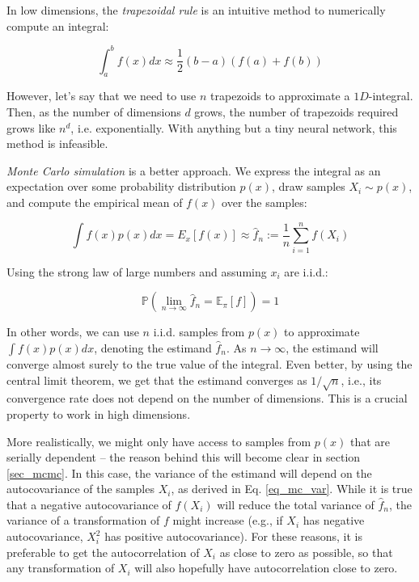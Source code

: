 \documentclass[12pt]{article}
\begin{document}
{In low dimensions, the \textit{trapezoidal rule} is an intuitive method to numerically compute an integral:

\begin{equation}
\int_{a}^{b} f(x) d x \approx \frac{1}{2}(b-a)(f(a)+f(b))
\end{equation}

However, let's say that we need to use $n$ trapezoids to approximate a $1D$-integral. Then, as the number of dimensions $d$ grows, the number of trapezoids required grows like $n^d$, i.e. exponentially. With anything but a tiny neural network, this method is infeasible.

\textit{Monte Carlo simulation} is a better approach. We express the integral as an expectation over some probability distribution $p(x)$, draw samples $X_i \sim p(x)$, and compute the empirical mean of $f(x)$ over the samples:

\begin{equation}
\int f(x)p(x) dx = E_x[f(x)] \approx \hat{f}_n := \frac{1}{n} \sum_{i=1}^n f(X_i)
\end{equation}

Using the strong law of large numbers and assuming $x_i$ are i.i.d.:

\begin{equation}
\mathbb{P}\left(\lim_{n \rightarrow \infty} \hat{f}_n = \mathbb{E}_{\pi}[f]\right)=1
\end{equation}

In other words, we can use $n$ i.i.d. samples from $p(x)$ to approximate $\int f(x)p(x) dx$, denoting the estimand $\hat{f}_n$. As $n \rightarrow \infty$, the estimand will converge almost surely to the true value of the integral. Even better, by using the central limit theorem, we get that the estimand converges as $1/\sqrt n$, i.e., its convergence rate does not depend on the number of dimensions. This is a crucial property to work in high dimensions.

More realistically, we might only have access to samples from $p(x)$ that are serially dependent -- the reason behind this will become clear in section \ref{sec_mcmc}. In this case, the variance of the estimand will depend on the autocovariance of the samples $X_i$, as derived in Eq. \ref{eq_mc_var}. While it is true that a negative autocovariance of $f(X_i)$ will reduce the total variance of $\hat{f}_n$, the variance of a transformation of $f$ might increase (e.g., if $X_i$ has negative autocovariance, $X_i^2$ has positive autocovariance). For these reasons, it is preferable to get the autocorrelation of $X_i$ as close to zero as possible, so that any transformation of $X_i$ will also hopefully have autocorrelation close to zero.

}
\end{document}

